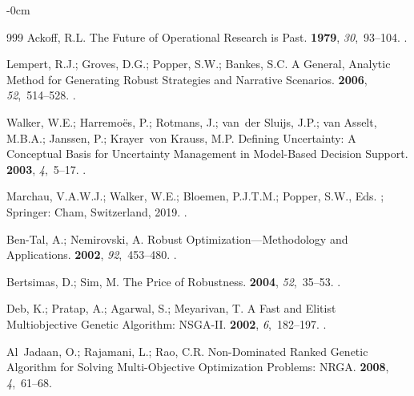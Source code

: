 \documentclass[systems,article,accept,moreauthors,pdftex]{Definitions/mdpi}
\begin{document}
\begin{adjustwidth}{-\extralength}{0cm}
\begin{thebibliography}{999}
Ackoff, R.L.
\newblock The Future of Operational Research is Past.
 {\bf 1979}, {\em
  30},~93--104.
.

Lempert, R.J.; Groves, D.G.; Popper, S.W.; Bankes, S.C.
\newblock A General, Analytic Method for Generating Robust Strategies and
  Narrative Scenarios.
 {\bf 2006}, {\em 52},~514--528.
.

Walker, W.E.; Harremo{\"e}s, P.; Rotmans, J.; van~der Sluijs, J.P.; van Asselt,
  M.B.A.; Janssen, P.; Krayer~von Krauss, M.P.
\newblock Defining Uncertainty: A Conceptual Basis for Uncertainty Management
  in Model-Based Decision Support.
 {\bf 2003}, {\em 4},~5--17.
.

Marchau, V.A.W.J.; Walker, W.E.; Bloemen, P.J.T.M.; Popper, S.W., Eds.
; Springer: Cham, Switzerland,  2019.
.

Ben-Tal, A.; Nemirovski, A.
\newblock Robust Optimization---Methodology and Applications.
 {\bf 2002}, {\em 92},~453--480.
.

Bertsimas, D.; Sim, M.
\newblock The Price of Robustness.
{\bf 2004}, {\em 52},~35--53.
.

Deb, K.; Pratap, A.; Agarwal, S.; Meyarivan, T.
\newblock A Fast and Elitist Multiobjective Genetic Algorithm: {NSGA-II}.
 {\bf 2002}, {\em
  6},~182--197.
.

Al~Jadaan, O.; Rajamani, L.; Rao, C.R.
\newblock Non-Dominated Ranked Genetic Algorithm for Solving Multi-Objective
  Optimization Problems: {NRGA}.
 {\bf
  2008}, {\em 4},~61--68.


\end{thebibliography}
\end{adjustwidth}
\end{document}
